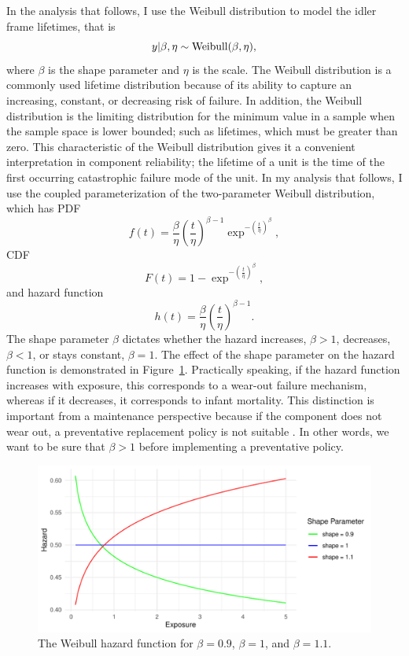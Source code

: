 In the analysis that follows, I use the Weibull distribution to model the idler frame lifetimes, that is
\begin{equation}
    y|\beta, \eta \sim \hbox{Weibull}(\beta, \eta),
\end{equation}
where $\beta$ is the shape parameter and $\eta$ is the scale. The Weibull distribution is a commonly used lifetime distribution because of its ability to capture an increasing, constant, or decreasing risk of failure. In addition, the Weibull distribution is the limiting distribution for the minimum value in a sample when the sample space is lower bounded; such as lifetimes, which must be greater than zero. This characteristic of the Weibull distribution gives it a convenient interpretation in component reliability; the lifetime of a unit is the time of the first occurring catastrophic failure mode of the unit. In my analysis that follows, I use the coupled parameterization of the two-parameter Weibull distribution, which has PDF
\begin{equation}
    f(t) = \frac{\beta}{\eta}\left(\frac{t}{\eta}\right)^{\beta - 1} \exp^{-\left(\frac{t}{\eta}\right)^{\beta}},
\end{equation}
CDF
\begin{equation}
    F(t) = 1 - \exp^{-\left(\frac{t}{\eta}\right)^{\beta}},
\end{equation}
and hazard function
\begin{equation}
    h(t) = \frac{\beta}{\eta}\left(\frac{t}{\eta}\right)^{\beta - 1}.
\end{equation}
The shape parameter $\beta$ dictates whether the hazard increases, $\beta > 1$, decreases, $\beta < 1$, or stays constant, $\beta = 1$. The effect of the shape parameter on the hazard function is demonstrated in Figure~\ref{fig:hazard_function_demo}. Practically speaking, if the hazard function increases with exposure, this corresponds to a wear-out failure mechanism, whereas if it decreases, it corresponds to infant mortality. This distinction is important from a maintenance perspective because if the component does not wear out, a preventative replacement policy is not suitable \citep{jardine2013}. In other words, we want to be sure that $\beta > 1$ before implementing a preventative policy.

\begin{figure}[h]
    \centering
    \includegraphics[width=1\textwidth]{./figures/hazard_func_demo.pdf}
    \caption{The Weibull hazard function for $\beta = 0.9$, $\beta = 1$, and $\beta = 1.1$.}
    \label{fig:hazard_function_demo}
\end{figure}

